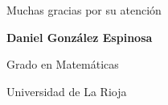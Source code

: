 \documentclass[xcolor=dvipsnames,10pt]{beamer}
\newcommand{\rioja}[1]{\textcolor[RGB]{115,0,60}{#1}}
\begin{document}
\begin{frame}[plain]
    \begin{center}
        \vspace{1.5cm}
        {\LARGE \rioja{Muchas gracias por su atención}}

        \vspace{1.5cm}
        {\large \textbf{Daniel González Espinosa}}

        \vspace{0.2cm}
        Grado en Matemáticas 
        
        Universidad de La Rioja
    \end{center}
\end{frame}
\end{document}
